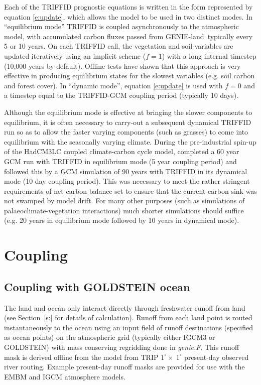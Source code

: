 \documentclass[a4paper]{article}
\newcommand{\gnl}{GENIE-land}
\begin{document}
Each of the TRIFFID prognostic equations is written in the form
represented by equation \eqref{e:update}, which allows the model to be
used in two distinct modes.  In ``equilibrium mode'' TRIFFID is
coupled asynchronously to the atmospheric model, with accumulated
carbon fluxes passed from \gnl\ typically every 5 or 10 years.  On
each TRIFFID call, the vegetation and soil variables are updated
iteratively using an implicit scheme ($f=1$) with a long internal
timestep (10,000 years by default). Offline tests have shown that this
approach is very effective in producing equilibrium states for the
slowest variables (e.g. soil carbon and forest cover).  In ``dynamic
mode'', equation \eqref{e:update} is used with $f=0$ and a timestep
equal to the TRIFFID-GCM coupling period (typically 10 days).

Although the equilibrium mode is effective at bringing the slower
components to equilibrium, it is often necessary to carry-out a
subsequent dynamical TRIFFID run so as to allow the faster varying
components (such as grasses) to come into equilibrium with the
seasonally varying climate. During the pre-industrial spin-up of the
HadCM3LC coupled climate-carbon cycle model, \citet{Cox00} completed a
60 year GCM run with TRIFFID in equilibrium mode (5 year coupling
period) and followed this by a GCM simulation of 90 years with TRIFFID
in its dynamical mode (10 day coupling period). This was necessary to
meet the rather stringent requirements of net carbon balance set to
ensure that the current carbon sink was not swamped by model
drift. For many other purposes (such as simulations of
palaeoclimate-vegetation interactions) much shorter simulations should
suffice (e.g. 20 years in equilibrium mode followed by 10 years in
dynamical mode).

\section{Coupling}\label{s:coup}
\subsection{Coupling with GOLDSTEIN ocean}\label{s:coup.gold}
The land and ocean only interact directly through freshwater runoff
from land (see Section~\ref{s:} for details of calculation).  Runoff
from each land point is routed instantaneously to the ocean using an
input field of runoff destinations (specified as ocean points) on the
atmospheric grid (typically either IGCM3 or GOLDSTEIN) with mass
conserving regridding done in {\em genie.F}.  This runoff mask is
derived offline from the model from TRIP $1^{\circ} \times\ 1^{\circ}$
present-day observed river routing.  Example present-day runoff masks
are provided for use with the EMBM and IGCM atmosphere models.
\end{document}
